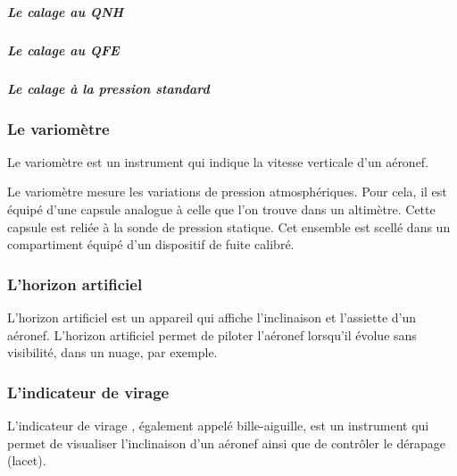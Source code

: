 	\subparagraph{Le calage au QNH}
	\subparagraph{Le calage au QFE}
	\subparagraph{Le calage à la pression standard}
	
	\subsubsection{Le variomètre}
	Le \gls{variomètre}  est un instrument qui indique la vitesse verticale d'un aéronef.
	
	\begin{figure}[H]	
	\centering
	\end{figure}
	
	Le variomètre mesure les variations de pression atmosphériques. Pour cela, il est équipé d'une capsule analogue à celle que l'on trouve dans un altimètre. Cette capsule est reliée à la sonde de pression statique. Cet ensemble est scellé dans un compartiment équipé d'un dispositif de fuite calibré. 
	
	
	\subsubsection{L'horizon artificiel}
	L'\gls{horizon artificiel}  est un appareil qui affiche l'inclinaison et l'assiette d'un aéronef. L'horizon artificiel permet de piloter l'aéronef lorsqu'il évolue sans visibilité, dans un nuage, par exemple.
	
	\begin{figure}[H]	
	\centering
	\end{figure}
	
	\subsubsection{L'indicateur de virage}
	L'\gls{indicateur de virage} , également appelé bille-aiguille, est un instrument qui permet de visualiser l'inclinaison d'un aéronef ainsi que de contrôler le dérapage (lacet).
	
